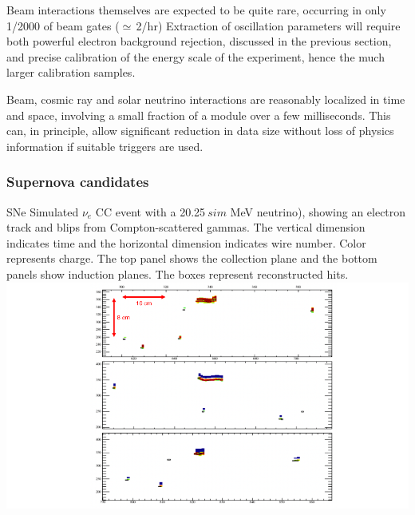 \documentclass[../main-v1.tex]{subfiles}
\begin{document}
Beam interactions themselves are expected to be quite rare, occurring in only 1/2000 of beam gates ($\simeq$\,2/hr)  Extraction of oscillation parameters will require both powerful electron background rejection, discussed in the previous section,  and precise calibration of the energy scale of the experiment, hence the much larger calibration samples.

Beam, cosmic ray and solar neutrino interactions are reasonably localized in time and space, involving a small fraction of a module over a few milliseconds.  This can, in principle, allow significant reduction in data size without loss of physics information if suitable triggers are used.


\subsubsection{Supernova candidates }\label{sec:supernova}



\begin{dunefigure}
{SNe} %
{
 Simulated $\nu_e$
 CC event with a 20.25$~sim$ MeV neutrino), showing an electron track and blips from Compton-scattered gammas. The vertical dimension indicates time and the horizontal dimension indicates wire number. Color represents charge. The top panel shows the collection plane and the bottom panels show induction planes. The boxes represent reconstructed hits. }
\includegraphics[width=\textwidth]{graphics/IntroFigures/nueCC_20-25MeV_event25_2.png} %
\end{dunefigure}
\end{document}
